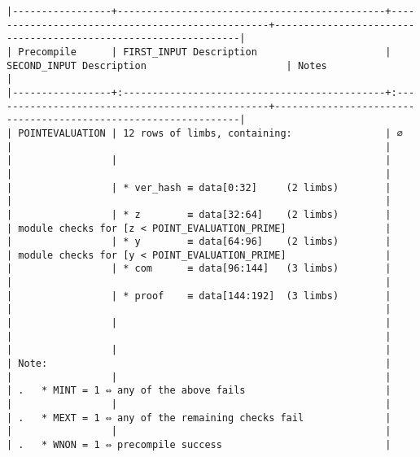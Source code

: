 \documentclass[varwidth=\maxdimen,margin=0.5cm,multi={verbatim}]{standalone}
\begin{document}
\begin{verbatim}
|-----------------+----------------------------------------------+-------------------------------------------------+----------------------------------------------------------------|
| Precompile      | FIRST_INPUT Description                      | SECOND_INPUT Description                        | Notes                                                          |
|-----------------+:---------------------------------------------+:------------------------------------------------+----------------------------------------------------------------|
| POINTEVALUATION | 12 rows of limbs, containing:                | ∅                                               |                                                                |
|                 |                                              |                                                 |                                                                |
|                 | * ver_hash ≡ data[0:32]     (2 limbs)        |                                                 |                                                                |
|                 | * z        ≡ data[32:64]    (2 limbs)        |                                                 | module checks for [z < POINT_EVALUATION_PRIME]                 |
|                 | * y        ≡ data[64:96]    (2 limbs)        |                                                 | module checks for [y < POINT_EVALUATION_PRIME]                 |
|                 | * com      ≡ data[96:144]   (3 limbs)        |                                                 |                                                                |
|                 | * proof    ≡ data[144:192]  (3 limbs)        |                                                 |                                                                |
|                 |                                              |                                                 |                                                                |
|                 |                                              |                                                 | Note:                                                          |
|                 |                                              |                                                 | .   * MINT = 1 ⇔ any of the above fails                        |
|                 |                                              |                                                 | .   * MEXT = 1 ⇔ any of the remaining checks fail              |
|                 |                                              |                                                 | .   * WNON = 1 ⇔ precompile success                            |

\end{verbatim}
\end{document}
